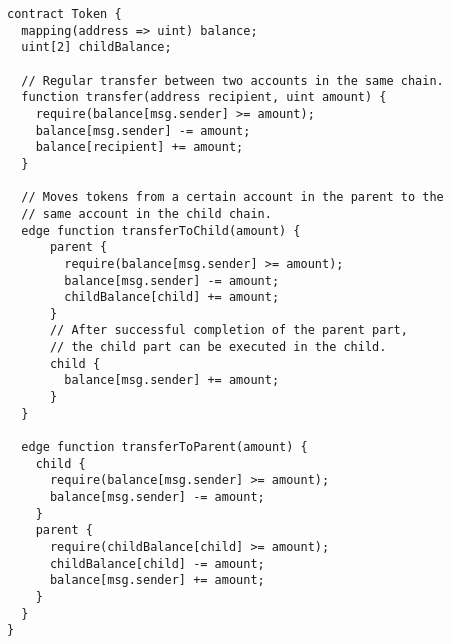 \documentclass[11pt,letterpaper]{article}
\begin{document}
\begin{lstlisting}
contract Token {
  mapping(address => uint) balance;
  uint[2] childBalance;

  // Regular transfer between two accounts in the same chain.
  function transfer(address recipient, uint amount) {
    require(balance[msg.sender] >= amount);
    balance[msg.sender] -= amount;
    balance[recipient] += amount;
  }

  // Moves tokens from a certain account in the parent to the
  // same account in the child chain.
  edge function transferToChild(amount) {
      parent {
        require(balance[msg.sender] >= amount);
        balance[msg.sender] -= amount;
        childBalance[child] += amount;
      }
      // After successful completion of the parent part,
      // the child part can be executed in the child.
      child {
        balance[msg.sender] += amount;
      }
  }

  edge function transferToParent(amount) {
    child {
      require(balance[msg.sender] >= amount);
      balance[msg.sender] -= amount;
    }
    parent {
      require(childBalance[child] >= amount);
      childBalance[child] -= amount;
      balance[msg.sender] += amount;
    }
  }
}
\end{lstlisting}
\end{document}
